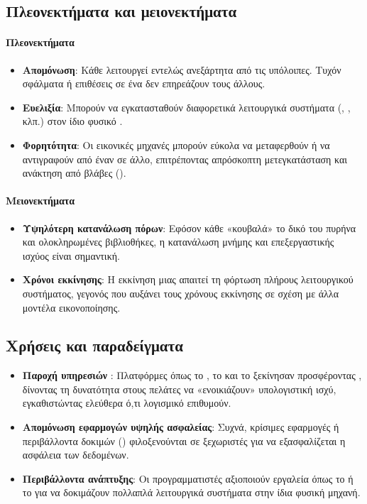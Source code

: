 \subsection{Πλεονεκτήματα και μειονεκτήματα}

\paragraph{Πλεονεκτήματα}
\begin{itemize}
  \item \textbf{Απομόνωση}: Κάθε  λειτουργεί εντελώς ανεξάρτητα από τις υπόλοιπες. Τυχόν σφάλματα ή επιθέσεις σε ένα  δεν επηρεάζουν τους άλλους.
  \item \textbf{Ευελιξία}: Μπορούν να εγκατασταθούν διαφορετικά λειτουργικά συστήματα (, ,  κλπ.) στον ίδιο φυσικό .
  \item \textbf{Φορητότητα}: Οι εικονικές μηχανές μπορούν εύκολα να μεταφερθούν ή να αντιγραφούν από έναν  σε άλλο, επιτρέποντας απρόσκοπτη μετεγκατάσταση και ανάκτηση από βλάβες ().
\end{itemize}

\paragraph{Μειονεκτήματα}
\begin{itemize}
  \item \textbf{Υψηλότερη κατανάλωση πόρων}: Εφόσον κάθε  «κουβαλά» το δικό του πυρήνα και ολοκληρωμένες βιβλιοθήκες, η κατανάλωση μνήμης και επεξεργαστικής ισχύος είναι σημαντική.
  \item \textbf{Χρόνοι εκκίνησης}: Η εκκίνηση μιας  απαιτεί τη φόρτωση πλήρους λειτουργικού συστήματος, γεγονός που αυξάνει τους χρόνους εκκίνησης σε σχέση με άλλα μοντέλα εικονοποίησης.
\end{itemize}

\subsection{Χρήσεις και παραδείγματα}

\begin{itemize}
  \item \textbf{Παροχή υπηρεσιών }: Πλατφόρμες όπως το , το  και το  ξεκίνησαν προσφέροντας , δίνοντας τη δυνατότητα στους πελάτες να «ενοικιάζουν» υπολογιστική ισχύ, εγκαθιστώντας ελεύθερα ό,τι λογισμικό επιθυμούν.
  \item \textbf{Απομόνωση εφαρμογών υψηλής ασφαλείας}: Συχνά, κρίσιμες εφαρμογές ή περιβάλλοντα δοκιμών () φιλοξενούνται σε ξεχωριστές  για να εξασφαλίζεται η ασφάλεια των δεδομένων.
  \item \textbf{Περιβάλλοντα ανάπτυξης}: Οι προγραμματιστές αξιοποιούν εργαλεία όπως το  ή το  για να δοκιμάζουν πολλαπλά λειτουργικά συστήματα στην ίδια φυσική μηχανή.
\end{itemize}

